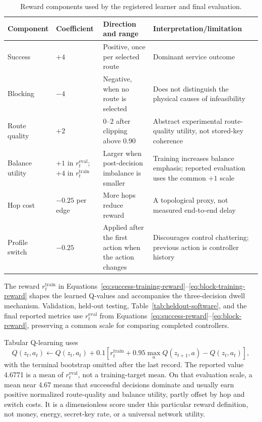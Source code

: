 \begin{table}[H]
\centering
\small
\caption{Reward components used by the registered learner and final evaluation.}
\label{tab:reward-components}
\begin{tabularx}{\textwidth}{@{}p{2.1cm}p{1.9cm}p{3.2cm}X@{}}
\toprule
\textbf{Component} & \textbf{Coefficient} & \textbf{Direction and range} &
\textbf{Interpretation/limitation}\\
\midrule
Success & $+4$ & Positive, once per selected route & Dominant service outcome\\
Blocking & $-4$ & Negative, when no route is selected & Does not distinguish the
physical causes of infeasibility\\
Route quality & $+2$ & $0$--$2$ after clipping above 0.90 & Abstract experimental
route-quality utility, not stored-key coherence\\
Balance utility & $+1$ in $r_t^{\mathrm{eval}}$; $+4$ in
$r_t^{\mathrm{train}}$ & Larger when post-decision imbalance is smaller & Training
increases balance emphasis; reported evaluation uses the common $+1$ scale\\
Hop cost & $-0.25$ per edge & More hops reduce reward & A topological proxy, not
measured end-to-end delay\\
Profile switch & $-0.25$ & Applied after the first action when the action changes &
Discourages control chattering; previous action is controller history\\
\bottomrule
\end{tabularx}
\end{table}

The reward $r_t^{\mathrm{train}}$ in
Equations~\eqref{eq:success-training-reward}--\eqref{eq:block-training-reward}
shapes the learned Q-values and accompanies the three-decision dwell mechanism.
Validation, held-out testing, Table~\ref{tab:heldout-software}, and the final reported
metrics use $r_t^{\mathrm{eval}}$ from
Equations~\eqref{eq:success-reward}--\eqref{eq:block-reward}, preserving a common
scale for comparing completed controllers.

Tabular Q-learning uses
\begin{equation}
Q(z_t,a_t)\leftarrow Q(z_t,a_t)+0.1
\left[r_t^{\mathrm{train}}+0.95\max_aQ(z_{t+1},a)-Q(z_t,a_t)\right],
\label{eq:exact-q-update}
\end{equation}
with the terminal bootstrap omitted after the last record. The reported value
4.6771 is a mean of $r_t^{\mathrm{eval}}$, not a training-target mean. On that
evaluation scale, a mean near 4.67 means that successful decisions dominate and
usually earn positive normalized route-quality and balance utility, partly offset
by hop and switch costs. It is a dimensionless score under this particular reward
definition, not money, energy, secret-key rate, or a universal network utility.

